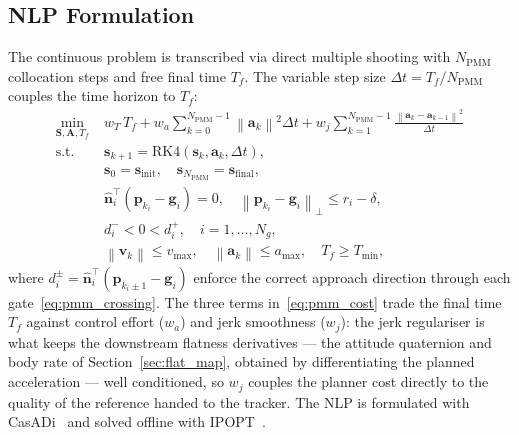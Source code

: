 \documentclass{ieeeaccess}
\newcommand{\norm}[1]{\left\| #1 \right\|}
\newcommand{\vect}[1]{\bm{#1}}
\newcommand{\dt}{\Delta t}
\newcommand{\st}{\text{s.t.}}
\begin{document}
\subsection{NLP Formulation}
\label{sec:pmm_nlp_formulation}

The continuous problem is transcribed via direct multiple shooting with
$N_\text{PMM}$ collocation steps and free final time $T_f$.
The variable step size $\dt = T_f/N_\text{PMM}$ couples the time horizon
to $T_f$:
%
\begin{subequations}
\label{eq:pmm_nlp}
\begin{align}
  \min_{\vect{S}, \vect{A}, T_f}\;&
     w_T\,T_f
     + w_a \sum_{k=0}^{N_\text{PMM}-1} \norm{\vect{a}_k}^2 \dt
     + w_j \sum_{k=1}^{N_\text{PMM}-1}
       \frac{\norm{\vect{a}_k - \vect{a}_{k-1}}^2}{\dt}
     \label{eq:pmm_cost}\\
  \st\quad & \vect{s}_{k+1} = \mathrm{RK4}(\vect{s}_k, \vect{a}_k, \dt),
     \label{eq:pmm_dyn_c}\\
  & \vect{s}_0 = \vect{s}_\text{init},\quad
              \vect{s}_{N_\text{PMM}} = \vect{s}_\text{final},
              \label{eq:pmm_bc}\\
  & \hat{\vect{n}}_i^\top (\vect{p}_{k_i} - \vect{g}_i) = 0,\quad
    \norm{\vect{p}_{k_i} - \vect{g}_i}_\perp \leq r_i - \delta,
              \label{eq:pmm_gate}\\
  & d_i^- < 0 < d_i^+, \quad i = 1,\dots,N_g,
              \label{eq:pmm_crossing}\\
  & \norm{\vect{v}_k} \leq v_{\max},\quad
              \norm{\vect{a}_k} \leq a_{\max},\quad T_f \geq T_{\min},
              \label{eq:pmm_bounds}
\end{align}
\end{subequations}
%
where $d_i^{\pm} = \hat{\vect{n}}_i^\top(\vect{p}_{k_i \pm 1} - \vect{g}_i)$
enforce the correct approach direction through each
gate~\eqref{eq:pmm_crossing}.
The three terms in~\eqref{eq:pmm_cost} trade the final time $T_f$
against control effort ($w_a$) and jerk smoothness ($w_j$): the jerk
regulariser is what keeps the downstream flatness derivatives ---
the attitude quaternion and body rate of
Section~\ref{sec:flat_map}, obtained by differentiating the planned
acceleration --- well conditioned, so $w_j$ couples the planner cost
directly to the quality of the reference handed to the tracker.
The NLP is formulated with CasADi~\cite{andersson2019casadi} and solved
offline with IPOPT~\cite{wachter2006implementation}.

\end{document}
